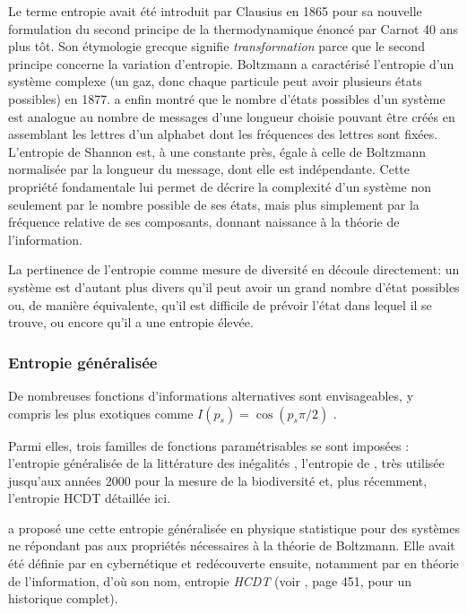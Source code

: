 \documentclass[fleqn,10pt]{ArtEcoFoG} %
\begin{document}
Le terme \og entropie\fg{} avait été introduit par Clausius en 1865 pour
sa nouvelle formulation du second principe de la thermodynamique énoncé
par Carnot 40 ans plus tôt. Son étymologie grecque signifie
\emph{transformation} parce que le second principe concerne la variation
d'entropie. Boltzmann a caractérisé l'entropie d'un système complexe (un
gaz, donc chaque particule peut avoir plusieurs états possibles) en
1877. \citet{Shannon1948} a enfin montré que le nombre d'états possibles
d'un système est analogue au nombre de messages d'une longueur choisie
pouvant être créés en assemblant les lettres d'un alphabet dont les
fréquences des lettres sont fixées. L'entropie de Shannon est, à une
constante près, égale à celle de Boltzmann normalisée par la longueur du
message, dont elle est indépendante. Cette propriété fondamentale lui
permet de décrire la complexité d'un système non seulement par le nombre
possible de ses états, mais plus simplement par la fréquence relative de
ses composants, donnant naissance à la théorie de l'information.

La pertinence de l'entropie comme mesure de diversité en découle
directement: un système est d'autant plus divers qu'il peut avoir un
grand nombre d'état possibles ou, de manière équivalente, qu'il est
difficile de prévoir l'état dans lequel il se trouve, ou encore qu'il a
une entropie élevée.

\subsubsection{Entropie généralisée}\label{entropie-generalisee}

De nombreuses fonctions d'informations alternatives sont envisageables,
y compris les plus exotiques comme \(I(p_s)=\cos({p_s \pi/2})\)
\citep{Gregorius2014}.

Parmi elles, trois familles de fonctions paramétrisables se sont
imposées : l'entropie généralisée de la littérature des inégalités
\citep{Shorrocks1980}, l'entropie de \citet{Renyi1961}, très utilisée
jusqu'aux années 2000 pour la mesure de la biodiversité et, plus
récemment, l'entropie HCDT détaillée ici.

\citet{Tsallis1988} a proposé une cette entropie généralisée en physique
statistique pour des systèmes ne répondant pas aux propriétés
nécessaires à la théorie de Boltzmann. Elle avait été définie par
\citet{Havrda1967} en cybernétique et redécouverte ensuite, notamment
par \citet{Daroczy1970} en théorie de l'information, d'où son nom,
entropie \emph{HCDT} (voir \citet{Mendes2008}, page 451, pour un
historique complet).
\end{document}
